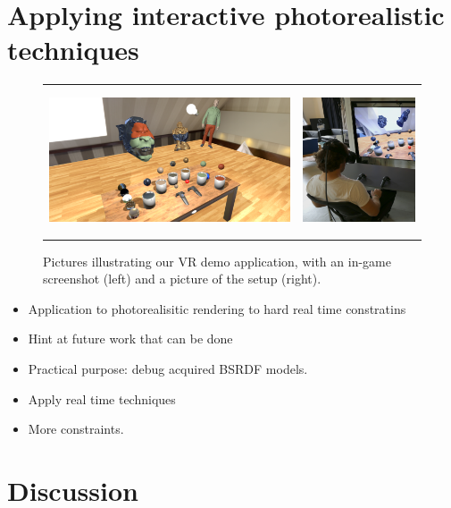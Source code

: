 \section{Applying interactive photorealistic techniques}
\begin{figure}
\centering
\begin{tabular}{@{}c@{}c@{}}
	 \includegraphics[height = 4.3cm]{figures/screen1_crop} &
		 \includegraphics[height = 4.3cm]{figures/person} \\[-2.5ex]
\end{tabular}
  \caption{Pictures illustrating our VR demo application, with an in-game screenshot (left) and a picture of the setup (right). }
  \label{fig:teaser}
\end{figure}

\begin{itemize}
\item Application to photorealisitic rendering to hard real time constratins
\item Hint at future work that can be done
\item Practical purpose: debug acquired BSRDF models.
\item Apply real time techniques
\item More constraints.
\end{itemize}

\section{Discussion}